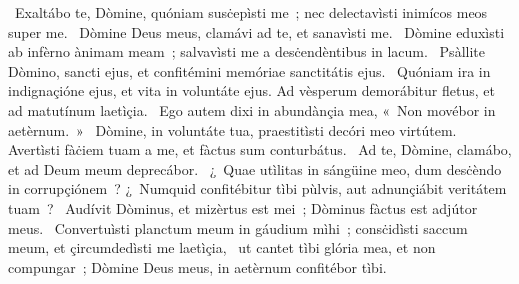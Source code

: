 \psalmChapterWithInscription{}
{ }
{%
~Exaltábo te, Dòmine, quóniam susċepìsti me~; nec delectavìsti inimícos meos super me. 
~Dòmine Deus meus, clamávi ad te, et sanavìsti me. 
~Dòmine eduxìsti ab infèrno ànimam meam~; salvavìsti me a desċendèntibus in lacum. 
~Psàllite Dòmino, sancti ejus, et confitémini memóriae sanctitátis ejus. 
~Quóniam ira in indignaçióne ejus, et vita in voluntáte ejus. Ad vèsperum demorábitur fletus, et ad matutínum laetìçia. 
~Ego autem dixi in abundànçia mea, «~Non movébor in aetèrnum.~»
~Dòmine, in voluntáte tua, praestitìsti decóri meo virtútem. Avertìsti fàċiem tuam a me, et fàctus sum conturbátus. 
~Ad te, Dòmine, clamábo, et ad Deum meum deprecábor. 
~¿~Quae utìlitas in sángüine meo, dum desċèndo in corrupçiónem~? ¿~Numquid confitébitur tìbi pùlvis, aut adnunçiábit veritátem tuam~? 
~Audívit Dòminus, et mizèrtus est mei~; Dòminus fàctus est adjútor meus. 
~Convertuìsti planctum meum in gáudium mìhi~; consċidìsti saccum meum, et çircumdedìsti me laetìçia, 
~ut cantet tìbi glória mea, et non compungar~; Dòmine Deus meus, in aetèrnum confitébor tìbi. 
}
